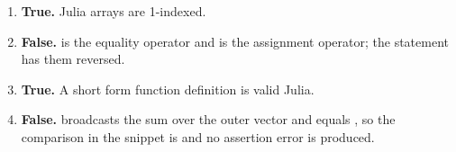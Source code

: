 \documentclass[a4paper]{article}
\begin{document}
\begin{enumerate}[itemsep=8pt]
    \item \textbf{True.}
        Julia arrays are 1-indexed.

    \item \textbf{False.}
        \julia{==} is the equality operator and \julia{=} is the
        assignment operator; the statement has them reversed.

    \item \textbf{True.}
        A short form function definition  is valid Julia.

    \item \textbf{False.}
         broadcasts the sum over the outer vector and
        equals \julia{[6, 9, 15]}, so the comparison in the snippet is
         and no assertion error is produced.
\end{enumerate}
\fi
\end{document}
